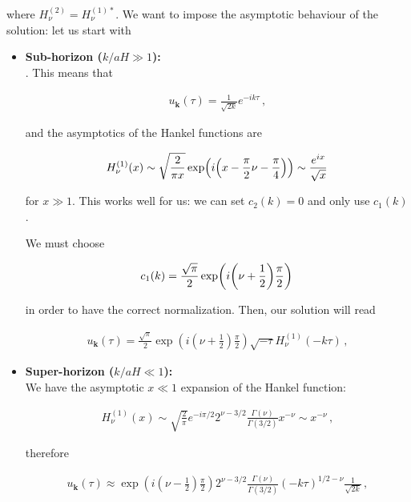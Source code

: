 where \(H^{(2)}_\nu = H^{(1)*}_\nu\). 
We want to impose the asymptotic behaviour of the solution: let us start with 
\begin{itemize}
    \item \textbf{Sub-horizon (\(k / aH \gg 1\)):}\\ . 
    This means that 
    
    \begin{align*}
         u_{\mathbf{k}}(\tau ) = \frac{1}{\sqrt{2k}} e^{-ik \tau }
        \,,
    \end{align*}
        
    
    
    and the asymptotics of the Hankel functions are
    
    \begin{align}
        H^{(1)}_\nu  (x) \sim \sqrt{ \frac{2}{\pi x}} \exp(i \qty(x - \frac{\pi}{2} \nu - \frac{\pi}{4})) \sim \frac{e^{ix}}{\sqrt{x}} \, \label{2.96}
    \end{align}
    
    for \(x \gg 1\). This works well for us: we can set \(c_2 (k) = 0\) and only use \(c_1 (k)\). 
    
    We must choose 
    
    \begin{align}
        c_1 (k) = \frac{\sqrt{\pi }}{2} \exp(i \qty(\nu + \frac{1}{2}) \frac{\pi}{2})\,\label{2.97}
    \end{align}
    
    in order to have the correct normalization. 
    Then, our solution will read 
    
    \begin{align}
         u_{\mathbf{k}}(\tau ) = \frac{\sqrt{\pi }}{2} \exp(i ( \nu + \frac{1}{2}) \frac{\pi}{2}) \sqrt{-\tau } H^{(1)}_\nu (- k \tau )
        \,,\label{2.98}
    \end{align}
    \item \textbf{Super-horizon (\(k /aH \ll 1\)):}\\
    We have the asymptotic \(x \ll 1\) expansion of the Hankel function:

    \begin{align}
        H^{(1)}_\nu (x) \sim \sqrt{ \frac{2}{\pi }} e^{- i \pi /2}
        2^{\nu - 3/2} \frac{\Gamma (\nu )}{\Gamma (3/2)} x^{-\nu } \sim x^{-\nu }
        \,,\label{2.99}
    \end{align}
    
    therefore 
    
    \begin{align}
         u_{\mathbf{k}}(\tau ) \approx \exp(i (\nu - \frac{1}{2}) \frac{\pi}{2})
        2^{\nu - 3/2}
        \frac{\Gamma (\nu )}{\Gamma (3/2)}
        (- k \tau )^{1/2 - \nu } \frac{1}{\sqrt{2 k}} 
        \,,\label{2.100}
    \end{align}
\end{itemize}


